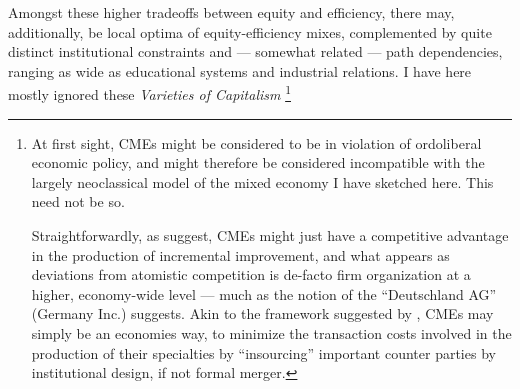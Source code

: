 \documentclass[11pt,a4paper,oneside,openright]{article}
\begin{document}
\begin{enumerate}
	Amongst these higher tradeoffs between equity and efficiency, there may, additionally, be local optima of equity-efficiency mixes, complemented by quite distinct institutional constraints and --- somewhat related --- path dependencies, ranging as wide as educational systems and industrial relations. 
	I have here mostly ignored these \emph{Varieties of Capitalism} \citep{HallSoskice-2001-aa}\footnote{
		At first sight, \glspl{CME} might be considered to be in violation of ordoliberal economic policy, and might therefore be considered incompatible with the largely neoclassical model of the mixed economy I have sketched here. 
		This need not be so. 
		
		Straightforwardly, as \citeauthor{HallSoskice-2001-aa} suggest, \glspl{CME} might just have a competitive advantage in the production of incremental improvement, and what appears as deviations from atomistic competition is de-facto firm organization at a higher, economy-wide level --- much as the notion of the ``Deutschland AG'' (Germany Inc.) suggests. 
		Akin to the framework suggested by \cite{Hart1990}, \glspl{CME} may simply be an economies way, to minimize the transaction costs involved in the production of their specialties by ``insourcing'' important counter parties by institutional design, if not formal merger. 
		
}
\end{enumerate}
\end{document}
